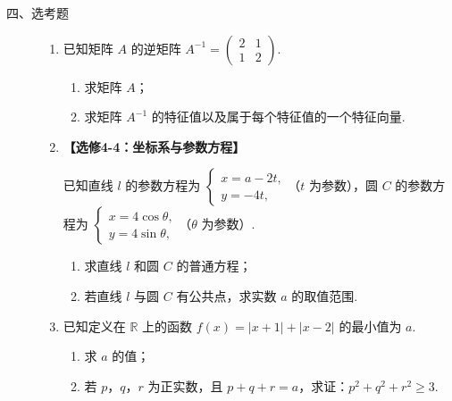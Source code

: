 \begin{description}

    \item[四、选考题]

    \begin{enumerate}[leftmargin=5pt]

      \addtocounter{enumi}{+20}

        \item 已知矩阵 \(A\) 的逆矩阵 \(A^{-1} = \begin{pmatrix} 2 & 1 \\ 1 & 2 \end{pmatrix}\).

\begin{enumerate}
\item 求矩阵 \(A\)；
\item 求矩阵 \(A^{-1}\) 的特征值以及属于每个特征值的一个特征向量.
\end{enumerate}

        \item \textbf{【选修4-4：坐标系与参数方程】}

已知直线 \(l\) 的参数方程为 \(\begin{cases}
x=a-2t,\\
y=-4t,
\end{cases}\)（\(t\) 为参数），圆 \(C\) 的参数方程为 \(\begin{cases}
x=4\cos\theta,\\
y=4\sin\theta,
\end{cases}\)（\(\theta\) 为参数）.

\begin{enumerate}
\item 求直线 \(l\) 和圆 \(C\) 的普通方程；
\item 若直线 \(l\) 与圆 \(C\) 有公共点，求实数 \(a\) 的取值范围.
\end{enumerate}

        \item 已知定义在 \(\mathbb{R}\) 上的函数 \(f(x) = |x + 1| + |x - 2|\) 的最小值为 \(a\).

\begin{enumerate}
\item 求 \(a\) 的值；
\item 若 \(p\)，\(q\)，\(r\) 为正实数，且 \(p + q + r = a\)，求证：\(p^2 + q^2 + r^2 \geqslant 3\).
\end{enumerate}

    \end{enumerate}

\end{description}


